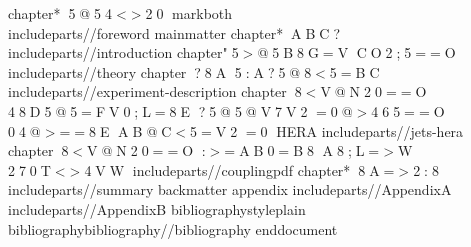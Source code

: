  
 \ c h a p t e r * { 5@54<>20} 
 
 \ m a r k b o t h {  } {  }   
 \ i n c l u d e { p a r t s / / f o r e w o r d } 
 \ m a i n m a t t e r 
 
 \ c h a p t e r * { ABC?} 
 \ i n c l u d e { p a r t s / / i n t r o d u c t i o n } 
 
 \ c h a p t e r { "5>@5B8G=V  CO2;5==O} 
 \ i n c l u d e { p a r t s / / t h e o r y } 
 
 \ c h a p t e r { ?8A  5:A?5@8<5=BC} 
 \ i n c l u d e { p a r t s / / e x p e r i m e n t - d e s c r i p t i o n } 
 
 \ c h a p t e r { 8<V@N20==O  48D5@5=FV0;L=8E  ?5@5@V7V2  =0@>465==O  04@>==8E  AB@C<5=V2  =0  H E R A } 
 \ i n c l u d e { p a r t s / / j e t s - h e r a } 
 
 \ c h a p t e r { 8<V@N20==O  :>=AB0=B8  A8;L=>W  270T<>4VW} 
 \ i n c l u d e { p a r t s / / c o u p l i n g p d f } 
 
 %
 %
 
 \ c h a p t e r * { 8A=>2:8} 
 \ i n c l u d e { p a r t s / / s u m m a r y } 
 
 \ b a c k m a t t e r   \ a p p e n d i x 
 
 \ i n c l u d e { p a r t s / / A p p e n d i x A } 
 
 \ i n c l u d e { p a r t s / / A p p e n d i x B } 
 
 \ b i b l i o g r a p h y s t y l e { p l a i n } 
 \ b i b l i o g r a p h y { b i b l i o g r a p h y / / b i b l i o g r a p h y } 
 
 \ e n d { d o c u m e n t } 
 